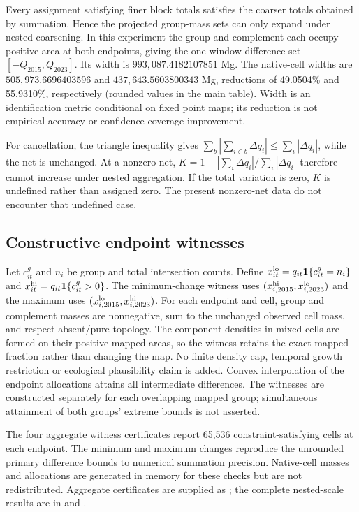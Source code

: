 Every assignment satisfying finer block totals satisfies the coarser totals obtained by summation. Hence the projected group-mass sets can only expand under nested coarsening. In this experiment the group and complement each occupy positive area at both endpoints, giving the one-window difference set $[-Q_{2015},Q_{2023}]$. Its width is $993{,}087.4182107851$ Mg. The native-cell widths are $505{,}973.6696403596$ and $437{,}643.5603800343$ Mg, reductions of 49.0504\% and 55.9310\%, respectively (rounded values in the main table). Width is an identification metric conditional on fixed point maps; its reduction is not empirical accuracy or confidence-coverage improvement.

For cancellation, the triangle inequality gives $\sum_b|\sum_{i\in b}\Delta q_i|\le\sum_i|\Delta q_i|$, while the net is unchanged. At a nonzero net, $K=1-|\sum_i\Delta q_i|/\sum_i|\Delta q_i|$ therefore cannot increase under nested aggregation. If the total variation is zero, $K$ is undefined rather than assigned zero. The present nonzero-net data do not encounter that undefined case.

\subsection{Constructive endpoint witnesses}
Let $c_{it}^g$ and $n_i$ be group and total intersection counts. Define $x_{it}^{\rm lo}=q_{it}\mathbf1\{c_{it}^g=n_i\}$ and $x_{it}^{\rm hi}=q_{it}\mathbf1\{c_{it}^g>0\}$. The minimum-change witness uses $(x_{i,2015}^{\rm hi},x_{i,2023}^{\rm lo})$ and the maximum uses $(x_{i,2015}^{\rm lo},x_{i,2023}^{\rm hi})$. For each endpoint and cell, group and complement masses are nonnegative, sum to the unchanged observed cell mass, and respect absent/pure topology. The component densities in mixed cells are formed on their positive mapped areas, so the witness retains the exact mapped fraction rather than changing the map. No finite density cap, temporal growth restriction or ecological plausibility claim is added. Convex interpolation of the endpoint allocations attains all intermediate differences. The witnesses are constructed separately for each overlapping mapped group; simultaneous attainment of both groups' extreme bounds is not asserted.

The four aggregate witness certificates report 65,536 constraint-satisfying cells at each endpoint. The minimum and maximum changes reproduce the unrounded primary difference bounds to numerical summation precision. Native-cell masses and allocations are generated in memory for these checks but are not redistributed. Aggregate certificates are supplied as ; the complete nested-scale results are in  and .


